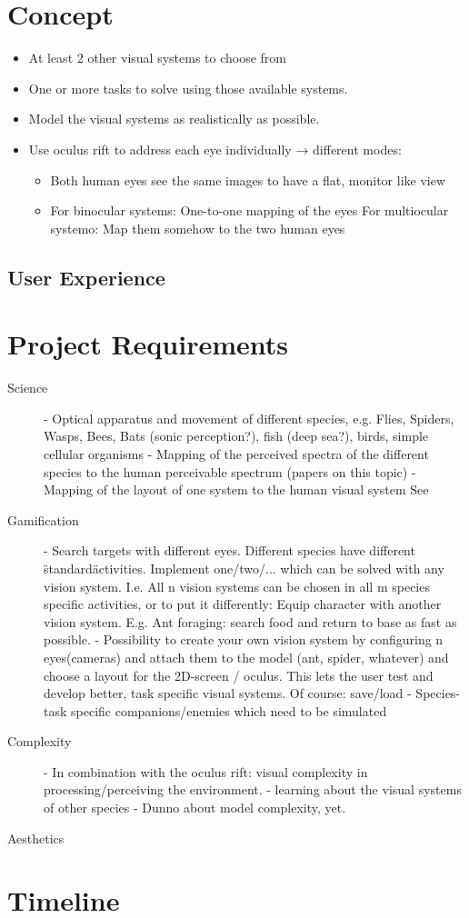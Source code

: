\documentclass{acm_proc_article-sp}
\begin{document}
\section{Concept}
\begin{itemize}
\item At least 2 other visual systems to choose from
\item One or more tasks to solve using those available systems.
\item Model the visual systems as realistically as possible.
\item Use oculus rift to address each eye individually → different modes:
  \begin{itemize}
  \item Both human eyes see the same images to have a flat, monitor like view
  \item For binocular systems: One-to-one mapping of the eyes
        For multiocular systemo: Map them somehow to the two human eyes
  \end{itemize}
\end{itemize}

\subsection{User Experience}

\section{Project Requirements}
\begin{description}
\item[Science]
- Optical apparatus and movement of different species, e.g.
    Flies, Spiders, Wasps, Bees, Bats (sonic perception?),
    fish (deep sea?), birds, simple cellular organisms
- Mapping of the perceived spectra of the different species to the human
  perceivable spectrum (papers on this topic)
- Mapping of the layout of one system to the human visual system
See \cite{insectvision}

\item[Gamification]
- Search targets with different eyes. Different species have different
  \"standard\" activities.
  Implement one/two/... which can be solved with any vision system.
  I.e. All n vision systems can be chosen in all m species specific activities,
  or to put it differently: Equip character with another vision system.
  E.g. Ant foraging: search food and return to base as fast as possible.
- Possibility to create your own vision system by configuring n eyes(cameras)
  and attach them to the model (ant, spider, whatever) and choose a layout
  for the 2D-screen / oculus.
  This lets the user test and develop better, task specific visual systems.
  Of course: save/load
- Species-task specific companions/enemies which need to be simulated

\item[Complexity]
- In combination with the oculus rift: visual complexity in
  processing/perceiving the environment.
- learning about the visual systems of other species
- Dunno about model complexity, yet.

\item[Aesthetics]
\end{description}

\section{Timeline}

\printbibliography
\end{document}
